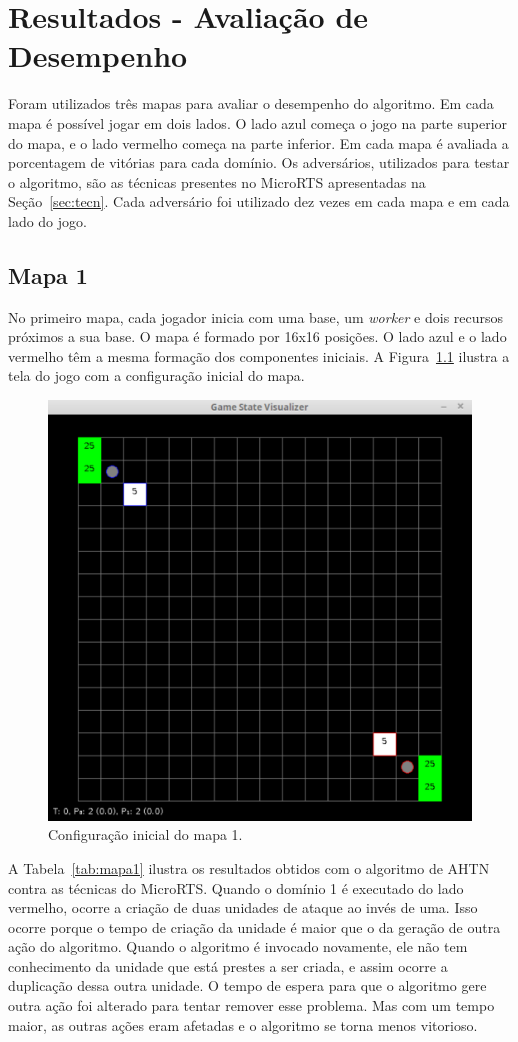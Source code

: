 
\chapter{\label{chap:results}Resultados - Avaliação de Desempenho}

Foram utilizados três mapas para avaliar o desempenho do algoritmo.
Em cada mapa é possível jogar em dois lados.
O lado azul começa o jogo na parte superior do mapa, e o lado vermelho começa na parte inferior.
Em cada mapa é avaliada a porcentagem de vitórias para cada domínio.
Os adversários, utilizados para testar o algoritmo, são as técnicas presentes no MicroRTS apresentadas na Seção~\ref{sec:tecn}.
Cada adversário foi utilizado dez vezes em cada mapa e em cada lado do jogo.

\section{Mapa 1}

No primeiro mapa, cada jogador inicia com uma base, um \textit{worker} e dois recursos próximos a sua base.
O mapa é formado por 16x16 posições.
O lado azul e o lado vermelho têm a mesma formação dos componentes iniciais.
A Figura~\ref{fig:mapa16x16} ilustra a tela do jogo com a configuração inicial do mapa.

\begin{figure}[ht]
	\centering
	\includegraphics[width=.5\textwidth]{fig/map16x16.pdf}
	\caption{Configuração inicial do mapa 1.}
	\label{fig:mapa16x16}
\end{figure}


A Tabela~\ref{tab:mapa1} ilustra os resultados obtidos com o algoritmo de AHTN contra as técnicas do MicroRTS.
Quando o domínio 1 é executado do lado vermelho, ocorre a criação de duas unidades de ataque ao invés de uma.
Isso ocorre porque o tempo de criação da unidade é maior que o da geração de outra ação do algoritmo.
Quando o algoritmo é invocado novamente, ele não tem conhecimento da unidade que está prestes a ser criada, e assim ocorre a duplicação dessa outra unidade.
O tempo de espera para que o algoritmo gere outra ação foi alterado para tentar remover esse problema.
Mas com um tempo maior, as outras ações eram afetadas e o algoritmo se torna menos vitorioso.

